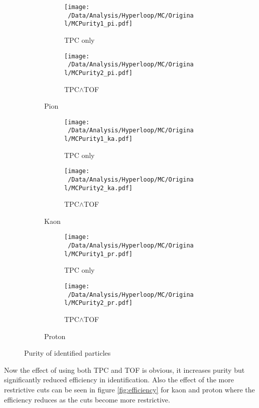 \documentclass[12pt,a4paper,twoside]{report}
\begin{document}
\begin{figure}[H]
	\begin{subfigure}{\linewidth}
		\begin{subfigure}{0.49\linewidth}
			\texttt{[image: ~/Data/Analysis/Hyperloop/MC/Original/MCPurity1\_pi.pdf]}
			\caption*{TPC only}
		\end{subfigure}
		\begin{subfigure}{0.49\linewidth}
			\texttt{[image: ~/Data/Analysis/Hyperloop/MC/Original/MCPurity2\_pi.pdf]}
			\caption*{TPC$\land$TOF}
		\end{subfigure}
		\caption{Pion}
	\end{subfigure}
	\begin{subfigure}{\linewidth}
		\begin{subfigure}{0.49\linewidth}
			\texttt{[image: ~/Data/Analysis/Hyperloop/MC/Original/MCPurity1\_ka.pdf]}
			\caption*{TPC only}
		\end{subfigure}
		\begin{subfigure}{0.49\linewidth}
			\texttt{[image: ~/Data/Analysis/Hyperloop/MC/Original/MCPurity2\_ka.pdf]}
			\caption*{TPC$\land$TOF}
		\end{subfigure}
		\caption{Kaon}
	\end{subfigure}
	\begin{subfigure}{\linewidth}
		\begin{subfigure}{0.49\linewidth}
			\texttt{[image: ~/Data/Analysis/Hyperloop/MC/Original/MCPurity1\_pr.pdf]}
			\caption*{TPC only}
		\end{subfigure}
		\begin{subfigure}{0.49\linewidth}
			\texttt{[image: ~/Data/Analysis/Hyperloop/MC/Original/MCPurity2\_pr.pdf]}
			\caption*{TPC$\land$TOF}
		\end{subfigure}
		\caption{Proton}
	\end{subfigure}
	\caption{\label{fig:purity}Purity of identified particles}
\end{figure}
Now the effect of using both TPC and TOF is obvious, it increases purity but significantly reduced efficiency in identification. Also the effect of the more restrictive cuts can be seen in figure \ref{fig:efficiency} for kaon and proton where the efficiency reduces as the cuts become more restrictive.
\end{document}
